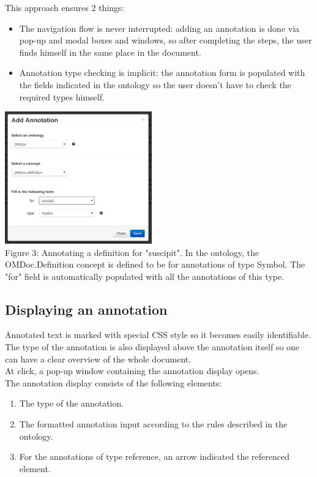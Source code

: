 \documentclass[a4paper, 12pt, notitlepage]{report}
\begin{document}
This approach ensures 2 things:

\begin{itemize}
\item The navigation flow is never interrupted: adding an annotation is done via pop-up
  and modal boxes and windows, so after completing the steps, the user finds himself in
  the same place in the document.
\item Annotation type checking is implicit: the annotation form is populated with the
  fields indicated in the ontology so the user doesn’t have to check the required types
  himself.
\end{itemize}

\begin{center}
 \includegraphics[width=2.5in]{add-definition.png}\\
 \tiny{Figure 3: Annotating a definition for "suscipit". In the ontology, the OMDoc.Definition concept is defined to be for annotations of type Symbol. The "for" field is
 automatically populated with all the annotations of this type.}
\end{center}

\subsection{Displaying an annotation}

Annotated text is marked with special CSS style so it becomes easily identifiable.
The type of the annotation is also displayed above the annotation itself so one can
have a clear overview of the whole document. \\

At click, a pop-up window containing the annotation display opens.\\

The annotation display consists of the following elements:

\begin{enumerate}
\item The type of the annotation.
\item The formatted annotation input according to the rules described in the ontology.
\item For the annotations of type reference, an arrow indicated the referenced element.
\end{enumerate}
\end{document}
